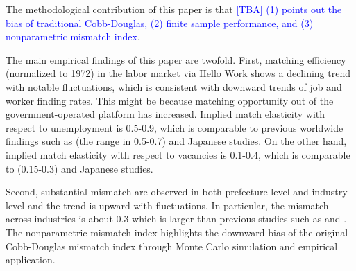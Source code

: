 \documentclass[12pt]{article}
\begin{document}
The methodological contribution of this paper is that \textcolor{blue}{[TBA] (1) points out the bias of traditional Cobb-Douglas, (2) finite sample performance, and (3) nonparametric mismatch index}.

The main empirical findings of this paper are twofold.
First, matching efficiency (normalized to 1972) in the labor market via  Hello Work shows a declining trend with notable fluctuations, which is consistent with downward trends of job and worker finding rates.
This might be because matching opportunity out of the government-operated platform has increased. 
Implied match elasticity with respect to unemployment is 0.5-0.9, which is comparable to previous worldwide findings such as \cite{petrongolo2001looking} (the range in 0.5-0.7) and Japanese studies.
On the other hand, implied match elasticity with respect to vacancies is 0.1-0.4, which is comparable to \cite{lange2020beyond} (0.15-0.3) and Japanese studies.

Second, substantial mismatch are observed in both prefecture-level and industry-level and the trend is upward with fluctuations.
In particular, the mismatch across industries is about 0.3 which is larger than previous studies such as \cite{shibata2020labor} and \cite{higashi2023did}.
The nonparametric mismatch index highlights the downward bias of the original Cobb-Douglas mismatch index through Monte Carlo simulation and empirical application.
\end{document}
